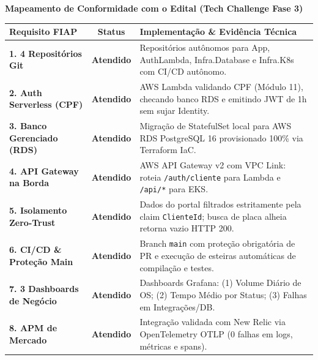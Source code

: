 \documentclass[9pt,a4paper]{article}
\begin{document}
\vspace{0.1cm}

\begin{tcolorbox}[cardbox]
    \textbf{\color{accentblue} Mapeamento de Conformidade com o Edital (Tech Challenge Fase 3)}\par\vspace{0.1cm}
    \begin{tabularx}{\textwidth}{l|c|X}
        \textbf{Requisito FIAP} & \textbf{Status} & \textbf{Implementação \& Evidência Técnica} \\
        \hline
        \textbf{1. 4 Repositórios Git} & \textbf{\color{taggreen}Atendido} & Repositórios autônomos para App, AuthLambda, Infra.Database e Infra.K8s com CI/CD autônomo. \\
        \textbf{2. Auth Serverless (CPF)} & \textbf{\color{taggreen}Atendido} & AWS Lambda validando CPF (Módulo 11), checando banco RDS e emitindo JWT de 1h sem sujar Identity. \\
        \textbf{3. Banco Gerenciado (RDS)} & \textbf{\color{taggreen}Atendido} & Migração de StatefulSet local para AWS RDS PostgreSQL 16 provisionado 100\% via Terraform IaC. \\
        \textbf{4. API Gateway na Borda} & \textbf{\color{taggreen}Atendido} & AWS API Gateway v2 com VPC Link: roteia \texttt{/auth/cliente} para Lambda e \texttt{/api/*} para EKS. \\
        \textbf{5. Isolamento Zero-Trust} & \textbf{\color{taggreen}Atendido} & Dados do portal filtrados estritamente pela claim \texttt{ClienteId}; busca de placa alheia retorna vazio HTTP 200. \\
        \textbf{6. CI/CD \& Proteção Main} & \textbf{\color{taggreen}Atendido} & Branch \texttt{main} com proteção obrigatória de PR e execução de esteiras automáticas de compilação e testes. \\
        \textbf{7. 3 Dashboards de Negócio} & \textbf{\color{taggreen}Atendido} & Dashboards Grafana: (1) Volume Diário de OS; (2) Tempo Médio por Status; (3) Falhas em Integrações/DB. \\
        \textbf{8. APM de Mercado} & \textbf{\color{taggreen}Atendido} & Integração validada com New Relic via OpenTelemetry OTLP (0 falhas em logs, métricas e spans). \\
    \end{tabularx}
\end{tcolorbox}

\vspace{0.15cm}
\end{document}

